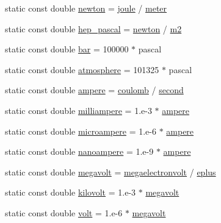 \begin{DoxyCompactItemize}
\item 
static const double \hyperlink{namespacedd4hep_a07c189d8b327db9b4ae12f3def589851}{newton} = \hyperlink{namespacedd4hep_a8cdc11c61e5f953baede59569544a324}{joule} / \hyperlink{namespacedd4hep_a46f5cf0231796af4296a307a58812b06}{meter}
\item 
static const double \hyperlink{namespacedd4hep_ad7dfeb546cf76cb6959665edbfd320bb}{hep\_\-pascal} = \hyperlink{namespacedd4hep_a07c189d8b327db9b4ae12f3def589851}{newton} / \hyperlink{namespacedd4hep_aea4ab60384218f15ec3ba53896735b6c}{m2}
\item 
static const double \hyperlink{namespacedd4hep_a77aaec852fdd6717b70a272fe4ef0473}{bar} = 100000 $\ast$ pascal
\item 
static const double \hyperlink{namespacedd4hep_a3907dd93dc8fc5b2f3b0fb9b92e46c5b}{atmosphere} = 101325 $\ast$ pascal
\item 
static const double \hyperlink{namespacedd4hep_a1342ab2280c2fed87fe4beaebae8cf52}{ampere} = \hyperlink{namespacedd4hep_a399f2340c615066766d822ce9c9781b7}{coulomb} / \hyperlink{namespacedd4hep_ac03364576705a245265d8ed6ea26b871}{second}
\item 
static const double \hyperlink{namespacedd4hep_a0df135e4eeb5cd94ace403e633d0c4af}{milliampere} = 1.e-\/3 $\ast$ \hyperlink{namespacedd4hep_a1342ab2280c2fed87fe4beaebae8cf52}{ampere}
\item 
static const double \hyperlink{namespacedd4hep_a1f84b64efe21c2df40a7816c4918e803}{microampere} = 1.e-\/6 $\ast$ \hyperlink{namespacedd4hep_a1342ab2280c2fed87fe4beaebae8cf52}{ampere}
\item 
static const double \hyperlink{namespacedd4hep_aab51ca424c36f5bc349f01bf9c502f2d}{nanoampere} = 1.e-\/9 $\ast$ \hyperlink{namespacedd4hep_a1342ab2280c2fed87fe4beaebae8cf52}{ampere}
\item 
static const double \hyperlink{namespacedd4hep_a0899b6d1861ddc5f615d06209fb6a9fe}{megavolt} = \hyperlink{namespacedd4hep_a4e39beba039f7a6bda24a7031c121b2a}{megaelectronvolt} / \hyperlink{namespacedd4hep_a96ccff254b6dcebf179c3630f6205857}{eplus}
\item 
static const double \hyperlink{namespacedd4hep_a40753aea7e38ef27423508645ac40b19}{kilovolt} = 1.e-\/3 $\ast$ \hyperlink{namespacedd4hep_a0899b6d1861ddc5f615d06209fb6a9fe}{megavolt}
\item 
static const double \hyperlink{namespacedd4hep_a1bbac6ed4a69b41427c9a44a513e2500}{volt} = 1.e-\/6 $\ast$ \hyperlink{namespacedd4hep_a0899b6d1861ddc5f615d06209fb6a9fe}{megavolt}
\item 

\end{DoxyCompactItemize}
